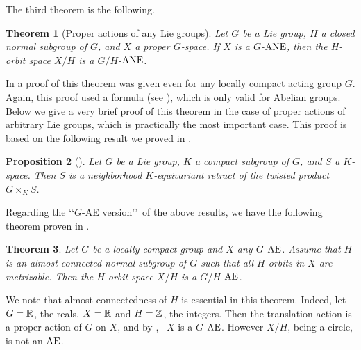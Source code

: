 \documentclass{amsart}
\newtheorem{theorem}{Theorem}[section]
\newtheorem{proposition}[theorem]{Proposition}
\begin{document}
   
  
  \medskip
  
 The third theorem is the following.
 
   \begin{theorem}[Proper actions of  any Lie groups]\label{T:00} Let $G$ be a Lie  group,  $H$  a closed normal subgroup of $G$, and $X$   a proper $G$-space. If 
 $X$ is a $G$-${\rm ANE}$, then the $H$-orbit space  $X/H$ is a $G/H$-${\rm ANE}$. 

\end{theorem} 

 In \cite[Theorem 1.1]{ant:proper}      a proof  of this theorem was given even for  any locally compact acting group $G$. Again, this proof used a formula  (see \cite[formula (3.3)]{ant:proper}), which is  only valid for Abelian groups. Below we give  a very brief proof of this theorem in the case of proper actions of arbitrary Lie groups, which is practically the most important case.
 This proof is based on the following  result we  proved 
 in \cite[Proposition 4.1]{ant:proper}.
  
  \begin{proposition}[\cite{ant:proper}]\label{P:1} Let $G$ be a Lie  group, $K$ a compact   subgroup of $G$, and $S$  a $K$-space. Then $S$ is a neighborhood $K$-equivariant retract of the twisted product $G\times_K S$.
\end{proposition}    
  
    \medskip
    
        
    Regarding the \lq\lq $G$-AE version\rq\rq \  of the above  results, we have the following theorem proven in \cite[Theorem 7.1]{ant:fund09}.
    
    
    \begin{theorem}\label{T:}
Let $G$ be a locally compact group and $X$ any   $G$-${\rm
{\rm AE}}$. Assume that $H$ is an almost connected normal subgroup of $G$
such that all $H$-orbits in $X$ are metrizable. Then the $H$-orbit space $X/H$ is a $G/H$-${\rm
AE}$.
\end{theorem}



\smallskip

 We note that almost connectedness  of $H$ is  essential in this theorem. Indeed, let    $G=\Bbb R$,
 the reals,  $X=\Bbb R$  and $H=\Bbb Z$,
 the integers.  Then the translation action is a proper action of $G$ on $X$, and  by
  \cite[Theorem 4.4]{abe:78}, \ $X$ is   a $G$-${\rm {\rm AE}}$.
  However $X/H$,  being a circle, is not  an ${\rm {\rm AE}}$.
  
\end{document}

